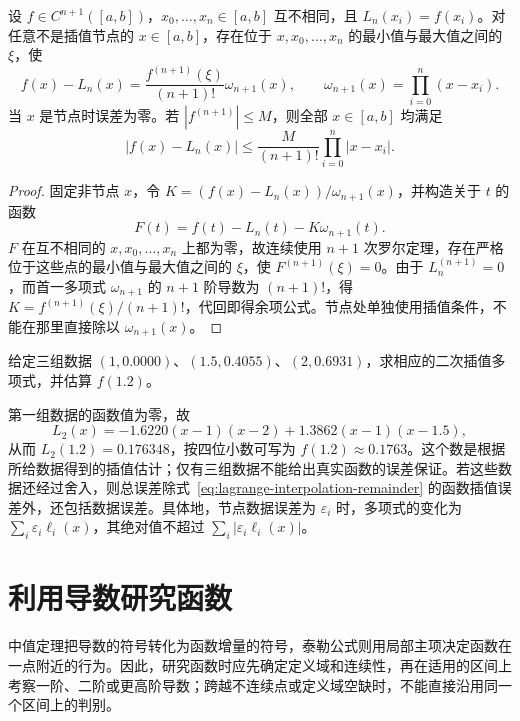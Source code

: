 \documentclass[UTF8,12pt,a4paper,fontset=fandol]{ctexbook}
\begin{document}
\begin{theorem}[插值余项]
\label{thm:lagrange-interpolation-remainder}
设 $f\in C^{n+1}([a,b])$，$x_0,\ldots,x_n\in[a,b]$ 互不相同，且 $L_n(x_i)=f(x_i)$。对任意不是插值节点的 $x\in[a,b]$，存在位于 $x,x_0,\ldots,x_n$ 的最小值与最大值之间的 $\xi$，使
\begin{equation}
    f(x)-L_n(x)=\frac{f^{(n+1)}(\xi)}{(n+1)!}\omega_{n+1}(x),
    \qquad \omega_{n+1}(x)=\prod_{i=0}^n(x-x_i).
    \label{eq:lagrange-interpolation-remainder}
\end{equation}
当 $x$ 是节点时误差为零。若 $|f^{(n+1)}|\leq M$，则全部 $x\in[a,b]$ 均满足
\[
    |f(x)-L_n(x)|\leq\frac{M}{(n+1)!}
        \prod_{i=0}^n|x-x_i|.
\]
\end{theorem}

\begin{proof}
固定非节点 $x$，令 $K=(f(x)-L_n(x))/\omega_{n+1}(x)$，并构造关于 $t$ 的函数
\[
    F(t)=f(t)-L_n(t)-K\omega_{n+1}(t).
\]
$F$ 在互不相同的 $x,x_0,\ldots,x_n$ 上都为零，故连续使用 $n+1$ 次罗尔定理，存在严格位于这些点的最小值与最大值之间的 $\xi$，使 $F^{(n+1)}(\xi)=0$。由于 $L_n^{(n+1)}=0$，而首一多项式 $\omega_{n+1}$ 的 $n+1$ 阶导数为 $(n+1)!$，得 $K=f^{(n+1)}(\xi)/(n+1)!$，代回即得余项公式。节点处单独使用插值条件，不能在那里直接除以 $\omega_{n+1}(x)$。
\end{proof}

\begin{example}
\label{ex:quadratic-interpolation-data}
给定三组数据 $(1,0.0000)$、$(1.5,0.4055)$、$(2,0.6931)$，求相应的二次插值多项式，并估算 $f(1.2)$。
\end{example}

\begin{solve}
第一组数据的函数值为零，故
\[
    L_2(x)=-1.6220(x-1)(x-2)+1.3862(x-1)(x-1.5),
\]
从而 $L_2(1.2)=0.176348$，按四位小数可写为 $f(1.2)\approx0.1763$。这个数是根据所给数据得到的插值估计；仅有三组数据不能给出真实函数的误差保证。若这些数据还经过舍入，则总误差除式~\eqref{eq:lagrange-interpolation-remainder} 的函数插值误差外，还包括数据误差。具体地，节点数据误差为 $\varepsilon_i$ 时，多项式的变化为 $\sum_i\varepsilon_i\ell_i(x)$，其绝对值不超过 $\sum_i|\varepsilon_i\ell_i(x)|$。
\end{solve}

\section{利用导数研究函数}
\label{sec:studying-functions-with-derivatives}

中值定理把导数的符号转化为函数增量的符号，泰勒公式则用局部主项决定函数在一点附近的行为。因此，研究函数时应先确定定义域和连续性，再在适用的区间上考察一阶、二阶或更高阶导数；跨越不连续点或定义域空缺时，不能直接沿用同一个区间上的判别。
\end{document}
